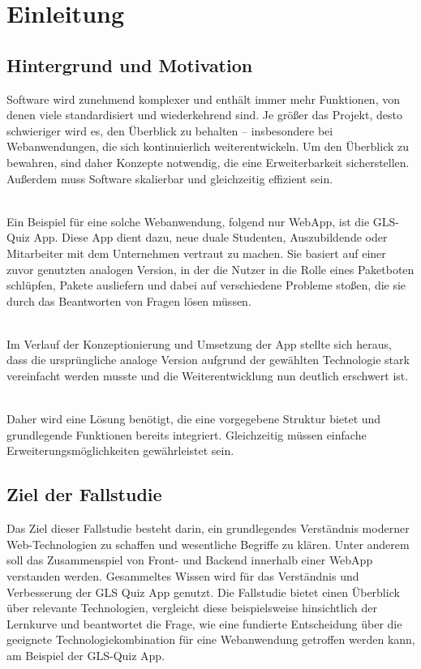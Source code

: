 \documentclass[biblatex]{lni}
\begin{document}
\section{Einleitung}

\subsection{Hintergrund und Motivation}
Software wird zunehmend komplexer und enthält immer mehr Funktionen, von denen viele standardisiert und wiederkehrend sind.
Je größer das Projekt, desto schwieriger wird es, den Überblick zu behalten – insbesondere bei Webanwendungen,
die sich kontinuierlich weiterentwickeln.
Um den Überblick zu bewahren, sind daher Konzepte notwendig, die eine Erweiterbarkeit sicherstellen.
Außerdem muss Software skalierbar und gleichzeitig effizient sein.

\\

Ein Beispiel für eine solche Webanwendung, folgend nur WebApp, ist die GLS-Quiz App.
Diese App dient dazu, neue duale Studenten, Auszubildende oder Mitarbeiter mit dem Unternehmen vertraut zu machen.
Sie basiert auf einer zuvor genutzten analogen Version, in der die Nutzer in die Rolle eines Paketboten schlüpfen,
Pakete ausliefern und dabei auf verschiedene Probleme stoßen, die sie durch das Beantworten von Fragen lösen müssen.

\\

Im Verlauf der Konzeptionierung und Umsetzung der App stellte sich heraus,
dass die ursprüngliche analoge Version aufgrund der gewählten Technologie stark vereinfacht werden musste
und die Weiterentwicklung nun deutlich erschwert ist.

\\

Daher wird eine Lösung benötigt,
die eine vorgegebene Struktur bietet und grundlegende Funktionen bereits integriert.
Gleichzeitig müssen einfache Erweiterungsmöglichkeiten gewährleistet sein.

\subsection{Ziel der Fallstudie}

Das Ziel dieser Fallstudie besteht darin,
ein grundlegendes Verständnis moderner Web-Technologien zu schaffen und wesentliche Begriffe zu klären.
Unter anderem soll das Zusammenspiel von Front- und Backend innerhalb einer \ac{WebApp} verstanden werden.
Gesammeltes Wissen wird für das Verständnis und Verbesserung der GLS Quiz App genutzt.
Die Fallstudie bietet einen Überblick über relevante Technologien,
vergleicht diese beispielsweise hinsichtlich der Lernkurve
und beantwortet die Frage,
wie eine fundierte Entscheidung über die geeignete Technologiekombination für eine Webanwendung getroffen werden kann,
am Beispiel der GLS-Quiz App.
\end{document}
